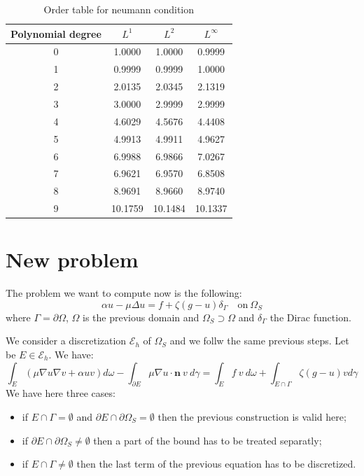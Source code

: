 \documentclass[a4paper,10pt]{article}
\begin{document}
\begin{table}[!ht]
\centering
\caption{Order table for neumann condition}
\begin{tabular}{|c|c|c|c|}
\hline
Polynomial degree & $L^1$ & $L^2$ & $L^\infty$ \\ \hline
0 & 1.0000 & 1.0000 & 0.9999 \\ \hline
1 & 0.9999 & 0.9999 & 1.0000 \\ \hline
2 & 2.0135 & 2.0345 & 2.1319 \\ \hline
3 & 3.0000 & 2.9999 & 2.9999 \\ \hline
4 & 4.6029 & 4.5676 & 4.4408 \\ \hline
5 & 4.9913 & 4.9911 & 4.9627 \\ \hline
6 & 6.9988 & 6.9866 & 7.0267 \\ \hline
7 & 6.9621 & 6.9570 & 6.8508 \\ \hline
8 & 8.9691 & 8.9660 & 8.9740 \\ \hline
9 & 10.1759 & 10.1484 & 10.1337 \\ \hline
\end{tabular}
\end{table}


\section{New problem}

The problem we want to compute now is the following:
\begin{equation*}
\alpha u - \mu \Delta u = f + \zeta (g-u) \delta_{\Gamma} \quad \text{on} \ \Omega_S
\end{equation*}
where $\Gamma = \partial \Omega$, $\Omega$ is the previous domain and $\Omega_S \supset \Omega$ and 
$\delta_{\Gamma}$ the Dirac function.

We consider a discretization $\mathcal{E}_h$ of $\Omega_S$ and we follw the same previous steps. 
Let be $E \in \mathcal{E}_h$. We have:
\begin{equation*}
\int_{E} (\mu \nabla u \nabla v + \alpha uv) d\omega - \int_{\partial E} \mu \nabla u \cdot 
\mathbf{n} \ v\ d\gamma = \int_{E}  f\ v\ d\omega + \int_{E \cap \Gamma} \zeta (g-u)v d\gamma
\end{equation*}
We have here three cases:
\begin{itemize}
 \item if $E \cap \Gamma = \emptyset$ and $\partial E \cap \partial \Omega_S = \emptyset$ then the 
previous construction is valid here;
\item if $\partial E \cap \partial \Omega_S \neq \emptyset$ then a part of the bound has to be 
treated separatly;
\item if $E \cap \Gamma \neq \emptyset$ then the last term of the previous equation has to be 
discretized.
\end{itemize}
\end{document}

